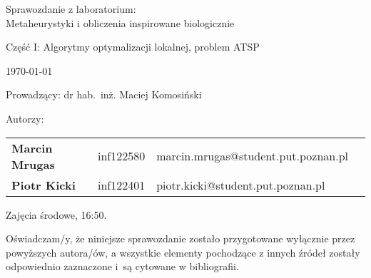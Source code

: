 \thispagestyle{empty} %

\begin{center}
{\large{Sprawozdanie z laboratorium:\\
Metaheurystyki i obliczenia inspirowane biologicznie}}

\vspace{3ex}

Część I: Algorytmy optymalizacji lokalnej, problem ATSP

\vspace{3ex}
{\footnotesize\today}

\end{center}


\vspace{10ex}

Prowadzący: dr hab.~inż. Maciej Komosiński

\vspace{5ex}

Autorzy:
\begin{tabular}{lllr}
    \textbf{Marcin Mrugas} & inf122580 & marcin.mrugas@student.put.poznan.pl \\
    \textbf{Piotr Kicki} & inf122401 & piotr.kicki@student.put.poznan.pl \\
\end{tabular}

\vspace{5ex}

Zajęcia środowe, 16:50.

\vspace{35ex}

\noindent Oświadczam/y, że niniejsze sprawozdanie zostało przygotowane wyłącznie przez powyższych autora/ów,
a wszystkie elementy pochodzące z innych źródeł zostały odpowiednio zaznaczone i~są cytowane w bibliografii.  

\newpage
